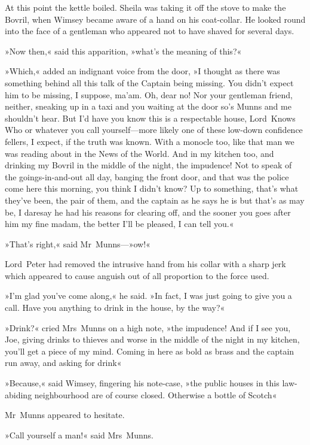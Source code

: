At this point the kettle boiled. Sheila was taking it off the stove to make the Bovril, when Wimsey became aware of a hand on his coat-collar. He looked round into the face of a gentleman who appeared not to have shaved for several days.

»Now then,« said this apparition, »what's the meaning of this?«

»Which,« added an indignant voice from the door, »I thought as there was something behind all this talk of the Captain being missing. You didn't expect him to be missing, I suppose, ma'am. Oh, dear no! Nor your gentleman friend, neither, sneaking up in a taxi and you waiting at the door so's Munns and me shouldn't hear. But I'd have you know this is a respectable house, Lord~Knows Who or whatever you call yourself—more likely one of these low-down confidence fellers, I expect, if the truth was known. With a monocle too, like that man we was reading about in the News of the World. And in my kitchen too, and drinking my Bovril in the middle of the night, the impudence! Not to speak of the goings-in-and-out all day, banging the front door, and that was the police come here this morning, you think I didn't know? Up to something, that's what they've been, the pair of them, and the captain as he says he is but that's as may be, I daresay he had his reasons for clearing off, and the sooner you goes after him my fine madam, the better I'll be pleased, I can tell you.«

»That's right,« said Mr~Munns—»ow!«

Lord~Peter had removed the intrusive hand from his collar with a sharp jerk which appeared to cause anguish out of all proportion to the force used.

»I'm glad you've come along,« he said. »In fact, I was just going to give you a call. Have you anything to drink in the house, by the way?«

»Drink?« cried Mrs~Munns on a high note, »the impudence! And if I see you, Joe, giving drinks to thieves and worse in the middle of the night in my kitchen, you'll get a piece of my mind. Coming in here as bold as brass and the captain run away, and asking for drink\longdash«

»Because,« said Wimsey, fingering his note-case, »the public houses in this law-abiding neighbourhood are of course closed. Otherwise a bottle of Scotch\longdash«

Mr~Munns appeared to hesitate.

»Call yourself a man!« said Mrs~Munns.

